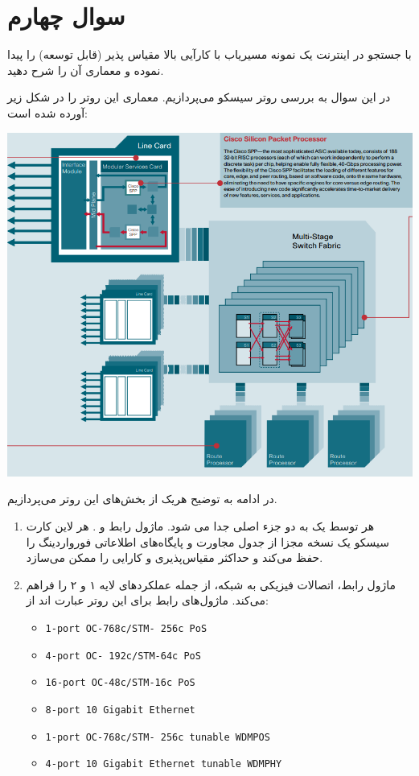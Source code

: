 \section{سوال چهارم}
با جستجو در اینترنت یک نمونه مسیریاب  با کارآیی بالا مقیاس پذیر (قابل توسعه) را پیدا نموده و معماری آن را شرح دهید.


\begin{qsolve}
	در این سوال به بررسی روتر سیسکو  می‌پردازیم. معماری این روتر را در شکل زیر آورده‌ شده است:
	
	\begin{center}
		\includegraphics*[width=0.7\linewidth]{pics/img2.png}
	\end{center}
	
	در ادامه به توضیح هریک از بخش‌های این روتر می‌پردازیم.
	
	\begin{enumerate}
		\item 
		 هر  توسط یک  به دو جزء اصلی جدا می شود. ماژول رابط و . هر لاین کارت سیسکو  یک نسخه مجزا از جدول مجاورت و پایگاه‌های اطلاعاتی فورواردینگ را حفظ می‌کند و حداکثر مقیاس‌پذیری و کارایی را ممکن می‌سازد.
	
	
	
	
		\item 
		 ماژول رابط، اتصالات فیزیکی به شبکه، از جمله عملکرد‌های لایه ۱ و ۲ را فراهم می‌کند. ماژول‌های رابط برای این روتر عبارت اند از:
		
		\begin{latin}
			\begin{itemize}
				\item \texttt{1-port OC-768c/STM- 256c PoS}
				\item \texttt{4-port OC- 192c/STM-64c PoS}
				\item \texttt{16-port OC-48c/STM-16c PoS}
				\item \texttt{8-port 10 Gigabit Ethernet}
				\item \texttt{1-port OC-768c/STM- 256c tunable WDMPOS}
				\item \texttt{4-port 10 Gigabit Ethernet tunable WDMPHY}
			\end{itemize} 
		\end{latin}
	\end{enumerate}
\end{qsolve}


